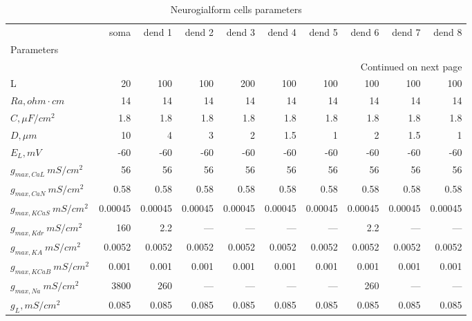 {\scriptsize
\begin{longtable}{lrrrrrrrrr}
\caption{Neurogialform cells parameters}\label{ca1__cell_parameters}\\
\toprule
{} &    soma &  dend 1 &  dend 2 &  dend 3 &  dend 4 &  dend 5 &  dend 6 &  dend 7 &  dend 8 \\
Parameters         &         &         &         &         &         &         &         &         &         \\
\midrule
\endhead
\midrule
\multicolumn{10}{r}{{Continued on next page}} \\
\midrule
\endfoot

\bottomrule
\endlastfoot
L                  &      20 &     100 &     100 &     200 &     100 &     100 &     100 &     100 &     100 \\
$Ra,
 ohm \cdot cm$                 &      14 &      14 &      14 &      14 &      14 &      14 &      14 &      14 &      14 \\
$C, \mu F / cm^2$                 &     1.8 &     1.8 &     1.8 &     1.8 &     1.8 &     1.8 &     1.8 &     1.8 &     1.8 \\
$D, \mu m$               &      10 &       4 &       3 &       2 &     1.5 &       1 &       2 &     1.5 &       1 \\
$E_L,  mV$          &     -60 &     -60 &     -60 &     -60 &     -60 &     -60 &     -60 &     -60 &     -60 \\
$g_{max, CaL       }\  mS / cm^2$&      56 &      56 &      56 &      56 &      56 &      56 &      56 &      56 &      56 \\
$g_{max, CaN       }\  mS / cm^2$&    0.58 &    0.58 &    0.58 &    0.58 &    0.58 &    0.58 &    0.58 &    0.58 &    0.58 \\
$g_{max, KCaS       }\  mS / cm^2$& 0.00045 & 0.00045 & 0.00045 & 0.00045 & 0.00045 & 0.00045 & 0.00045 & 0.00045 & 0.00045 \\
$g_{max, Kdr }\  mS / cm^2$&     160 &     2.2 &    ---  &    ---  &    ---  &    ---  &     2.2 &    ---  &    ---  \\
$g_{max, KA     }\  mS / cm^2$&  0.0052 &  0.0052 &  0.0052 &  0.0052 &  0.0052 &  0.0052 &  0.0052 &  0.0052 &  0.0052 \\
$g_{max, KCaB      }\  mS / cm^2$&   0.001 &   0.001 &   0.001 &   0.001 &   0.001 &   0.001 &   0.001 &   0.001 &   0.001 \\
$g_{max, Na     }\  mS / cm^2$&    3800 &     260 &    ---  &    ---  &    ---  &    ---  &     260 &    ---  &    ---  \\
$g_L,  mS / cm^2$       &   0.085 &   0.085 &   0.085 &   0.085 &   0.085 &   0.085 &   0.085 &   0.085 &   0.085 \\
\end{longtable}
}